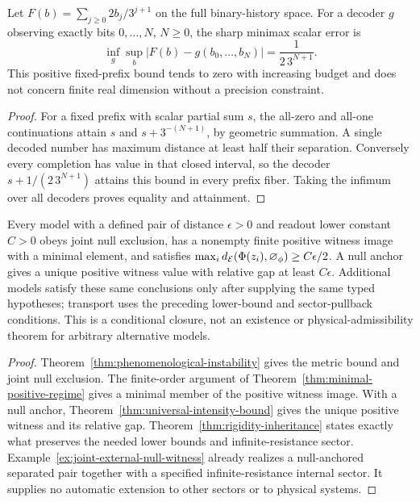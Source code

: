 \begin{theorem}\label{thm:null-simulation-lower-bound}
Let $F(b)=\sum_{j\geq0}2b_j/3^{j+1}$ on the full binary-history space.
For a decoder $g$ observing exactly bits $0,\ldots,N$, $N\geq0$, the sharp
minimax scalar error is
\[
 \inf_g\sup_b|F(b)-g(b_0,\ldots,b_N)|=\frac1{2\,3^{N+1}}.
\]
This positive fixed-prefix bound tends to zero with increasing budget and
does not concern finite real dimension without a precision constraint.
\end{theorem}
\begin{proof}
For a fixed prefix with scalar partial sum $s$, the all-zero and all-one
continuations attain $s$ and $s+3^{-(N+1)}$, by geometric summation.
A single decoded number has maximum distance at least half their separation.
Conversely every completion has value in that closed interval, so the
decoder $s+1/(2\,3^{N+1})$ attains this bound in every prefix fiber.
Taking the infimum over all decoders proves equality and attainment.
\end{proof}

\begin{theorem}\label{thm:null-closure-by-non-alternatives}
Every model with a defined pair of distance $\epsilon>0$ and readout lower
constant $C>0$ obeys joint null exclusion, has a nonempty finite positive
witness image with a minimal element, and satisfies
$\max_id_{\mathcal{E}}(\Phi(z_i),\varnothing_\phi)\geq C\epsilon/2$.
A null anchor gives a unique positive witness value with relative gap at least
$C\epsilon$. Additional models satisfy these same conclusions only after
supplying the same typed hypotheses; transport uses the preceding lower-bound
and sector-pullback conditions. This is a conditional closure, not an existence
or physical-admissibility theorem for arbitrary alternative models.
\end{theorem}
\begin{proof}
Theorem~\ref{thm:phenomenological-instability} gives the metric bound and
joint null exclusion. The finite-order argument of
Theorem~\ref{thm:minimal-positive-regime} gives a minimal member of the
positive witness image. With a null anchor,
Theorem~\ref{thm:universal-intensity-bound} gives the unique positive witness
and its relative gap. Theorem~\ref{thm:rigidity-inheritance} states exactly
what preserves the needed lower bounds and infinite-resistance sector.
Example~\ref{ex:joint-external-null-witness} already realizes a null-anchored
separated pair together with a specified infinite-resistance internal sector.
It supplies no automatic extension to other sectors or to physical systems.
\end{proof}
